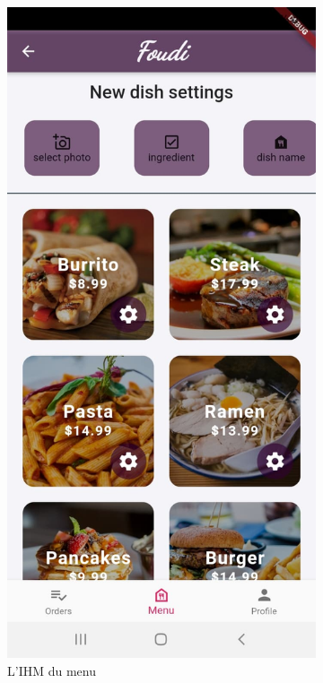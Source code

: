 \documentclass[french, a4paper, 12pt]{report}
\begin{document}
\begin{figure}[h!]
\centering
\begin{subfigure}{.5\textwidth}
  \centering
  \includegraphics[width=.9\linewidth]{screenshots/Restaurantviews/MenuSetup.jpg}
  \caption{L'IHM du menu}
  \label{fig:restconfig}
\end{subfigure}%
\begin{subfigure}{.5\textwidth}

\end{subfigure}
\end{figure}
\end{document}
